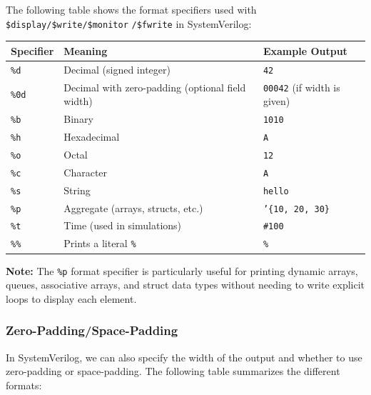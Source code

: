 \documentclass[12pt, a4paper]{article}
\begin{document}
The following table shows the format specifiers used with \texttt{\$display/\$write/\$monitor}  \texttt{/\$fwrite} in SystemVerilog:

\vspace{-1em}

\begin{center}
\begin{tabular}{|l|p{}|p{}|}
\hline
\textbf{Specifier} & \textbf{Meaning} & \textbf{Example Output} \\
\hline
\texttt{\%d} & Decimal (signed integer) & \texttt{42} \\
\hline
\texttt{\%0d} & Decimal with zero-padding (optional field width) & \texttt{00042} (if width is given) \\
\hline
\texttt{\%b} & Binary & \texttt{1010} \\
\hline
\texttt{\%h} & Hexadecimal & \texttt{A} \\
\hline
\texttt{\%o} & Octal & \texttt{12} \\
\hline
\texttt{\%c} & Character & \texttt{A} \\
\hline
\texttt{\%s} & String & \texttt{hello} \\
\hline
\texttt{\%p} & Aggregate (arrays, structs, etc.) & \texttt{'\{10, 20, 30\}} \\
\hline
\texttt{\%t} & Time (used in simulations) & \texttt{\#100} \\
\hline
\texttt{\%\%} & Prints a literal \texttt{\%} & \texttt{\%} \\
\hline
\end{tabular}
\end{center}

\textbf{Note:} The \texttt{\%p} format specifier is particularly useful for printing dynamic arrays, queues, associative arrays, and struct data types without needing to write explicit loops to display each element.

\subsubsection{Zero-Padding/Space-Padding}

In SystemVerilog, we can also specify the width of the output and whether to use zero-padding or space-padding. The following table summarizes the different formats:

\vspace{-0.8em}
\end{document}
